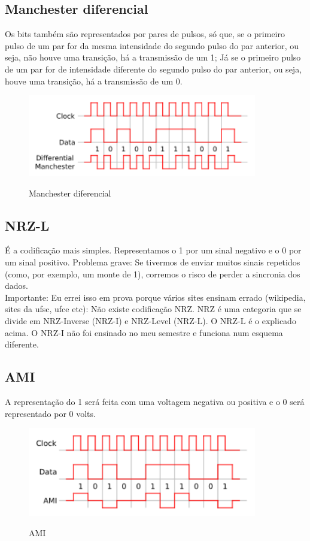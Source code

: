 \documentclass{article}
\begin{document}
\subsection{Manchester diferencial}
Os bits também são representados por pares de pulsos, só que, se o primeiro
pulso de um par for da mesma intensidade do segundo pulso do par anterior, ou
seja, não houve uma transição, há a transmissão de um 1; Já se o primeiro pulso
de um par for de intensidade diferente do segundo pulso do par anterior, ou
seja, houve uma transição, há a transmissão de um 0.
\begin{figure}[h]
    \center
    \includegraphics[width=10cm]{imagens/manchesterdiff.png}
    \label{manchesterdiff}
    \caption{Manchester diferencial}
\end{figure}

\subsection{NRZ-L}
É a codificação mais simples. Representamos o 1 por um sinal negativo e o 0 por um sinal positivo. Problema grave: Se tivermos de enviar muitos sinais repetidos (como, por
exemplo, um monte de 1), corremos o risco de perder a sincronia dos dados.\\
Importante: Eu errei isso em prova porque vários sites ensinam errado (wikipedia, sites da ufsc, ufce etc): Não existe codificação NRZ. NRZ é uma categoria que se divide em NRZ-Inverse (NRZ-I) e NRZ-Level (NRZ-L). O NRZ-L é o explicado acima. O NRZ-I não foi ensinado no meu semestre e funciona num esquema diferente.


\subsection{AMI}
A representação do 1 será feita com uma voltagem negativa ou positiva e o 0 será
representado por 0 volts.

\begin{figure}[h]
    \center
    \includegraphics[width=10cm]{imagens/ami.png}
    \label{ami}
    \caption{AMI}
\end{figure}
\end{document}

